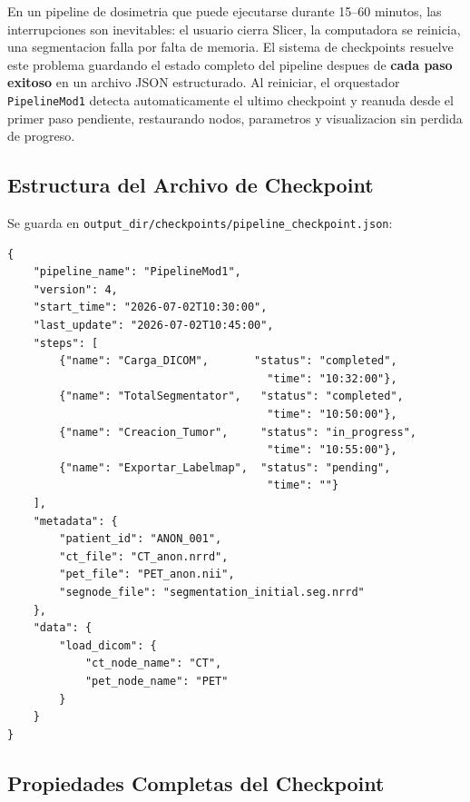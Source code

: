 \documentclass[12pt,a4paper]{article}
\begin{document}
En un pipeline de dosimetria que puede ejecutarse durante 15--60 minutos, las interrupciones son
inevitables: el usuario cierra Slicer, la computadora se reinicia, una segmentacion falla por
falta de memoria. El sistema de checkpoints resuelve este problema guardando el estado completo
del pipeline despues de \textbf{cada paso exitoso} en un archivo JSON estructurado. Al reiniciar,
el orquestador \texttt{PipelineMod1} detecta automaticamente el ultimo checkpoint y reanuda desde
el primer paso pendiente, restaurando nodos, parametros y visualizacion sin perdida de progreso.

\subsection{Estructura del Archivo de Checkpoint}

Se guarda en \texttt{output\_dir/checkpoints/pipeline\_checkpoint.json}:

\begin{verbatim}
{
    "pipeline_name": "PipelineMod1",
    "version": 4,
    "start_time": "2026-07-02T10:30:00",
    "last_update": "2026-07-02T10:45:00",
    "steps": [
        {"name": "Carga_DICOM",       "status": "completed",
                                        "time": "10:32:00"},
        {"name": "TotalSegmentator",   "status": "completed",
                                        "time": "10:50:00"},
        {"name": "Creacion_Tumor",     "status": "in_progress",
                                        "time": "10:55:00"},
        {"name": "Exportar_Labelmap",  "status": "pending",
                                        "time": ""}
    ],
    "metadata": {
        "patient_id": "ANON_001",
        "ct_file": "CT_anon.nrrd",
        "pet_file": "PET_anon.nii",
        "segnode_file": "segmentation_initial.seg.nrrd"
    },
    "data": {
        "load_dicom": {
            "ct_node_name": "CT",
            "pet_node_name": "PET"
        }
    }
}
\end{verbatim}

\subsection{Propiedades Completas del Checkpoint}
\end{document}

